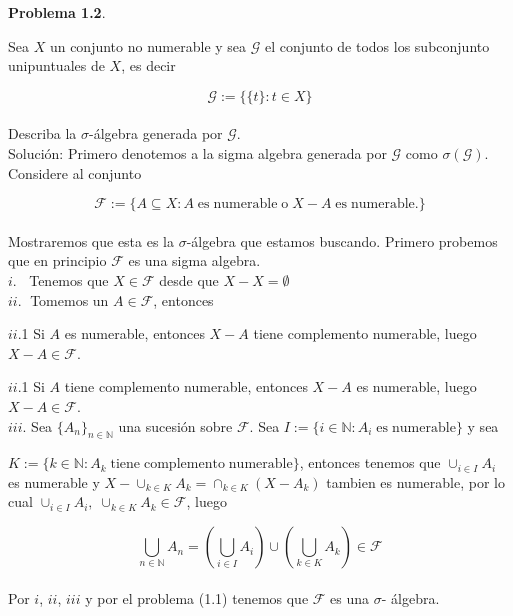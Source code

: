 \documentclass[12pt]{article}
\begin{document}
    \newpage

    \textbf{Problema 1.2}. 
    
    Sea $X$ un conjunto no numerable y sea $\mathcal{G}$ el conjunto de todos 
    los subconjunto unipuntuales de $X$, es decir

    \[\mathcal{G} := \{\{t\} : t\in X\}\]
    \\
    Describa la $\sigma$-\'algebra generada por $\mathcal{G}$.
    \\

    Soluci\'on: Primero denotemos a la sigma algebra generada por $\mathcal{G}$ como
    $\sigma(\mathcal{G})$. Considere al conjunto 

    \[\mathcal{F} := \{A\subseteq X : A \; \mathrm{es \; numerable \; o} \; X-A \; \mathrm{es \; numerable.}\}\]
    \\
    Mostraremos que esta es la $\sigma$-\'algebra que estamos buscando. Primero probemos que
    en principio $\mathcal{F}$ es una sigma algebra. 
    \\

    $i.\;\;$ Tenemos que $X\in \mathcal{F}$ desde que $X-X = \emptyset$ 
    \\

    $ii.\;$ Tomemos un $A\in \mathcal{F}$, entonces

    \hspace*{12pt} $ii$.1 Si $A$ es numerable, entonces $X-A$ tiene complemento numerable, 
    luego $X-A\in \mathcal{F}$.

    \hspace*{12pt} $ii$.1 Si $A$ tiene complemento numerable, entonces $X-A$ es numerable,
    luego $X-A\in \mathcal{F}$.
    \\

    $iii.$ Sea $\{A_n\}_{n\in \mathbb{N}}$ una sucesi\'on sobre $\mathcal{F}$. Sea 
    $I := \{i\in \mathbb{N} : A_i \; \mathrm{es \; numerable}\}$ y sea

    \hspace*{12pt} $K := \{k\in \mathbb{N} : A_k \; \mathrm{tiene \; complemento \; numerable}\}$, entonces 
    tenemos que $\cup_{i\in I}A_i$  \hspace*{30pt} es numerable y $X-\cup_{k\in K}A_k = \cap_{k\in K}(X-A_k)$
    tambien es numerable, por lo cual  
    \hspace*{30pt} $\cup_{i\in I}A_i,\; \cup_{k\in K}A_k\in \mathcal{F}$,
    luego

    \[\bigcup_{n\in \mathbb{N}}A_n = \left(\bigcup_{i\in I}A_i\right)\cup\left(\bigcup_{k\in K}A_k\right)\in \mathcal{F}\]
    \\
    Por $i$, $ii$, $iii$ y por el problema (1.1) tenemos que $\mathcal{F}$ es una $\sigma$-
    \'algebra. 
    \\
\end{document}
